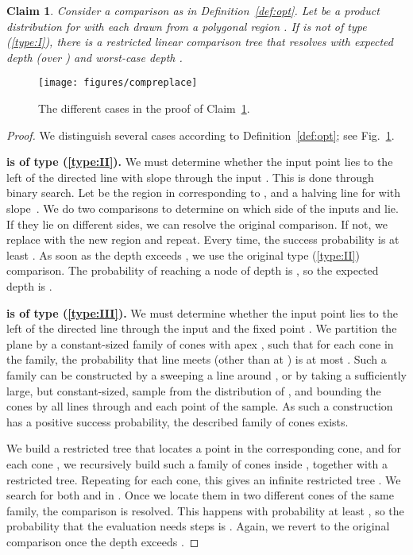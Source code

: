 \documentclass[letterpaper,11pt]{article}
\newtheorem{claim}[theorem]{Claim}
\begin{document}
\begin{claim} \label{clm:node} 
  Consider a comparison  as 
  in Definition~\ref{def:opt}. 
  Let  be a product distribution 
  for  with each  drawn 
  from a polygonal region . If  is not of
  type \textup(\ref{type:I}\textup), there is
  a restricted linear comparison tree  
  that resolves  with expected depth 
   (over ) and worst-case
  depth .
\end{claim}
\begin{figure}
  \centering
  \texttt{[image: figures/compreplace]}
  \caption{The different cases in the proof of Claim~\ref{clm:node}.}
  \label{fig:compreplace}
\end{figure}
\begin{proof}
We distinguish several cases 
according to Definition~\ref{def:opt}; 
see Fig.~\ref{fig:compreplace}.

\noindent\textbf{ is of type (\ref{type:II}).} 
We must determine 
whether the input point  lies 
to the left of the directed line 
with slope  
through the input .
This is done through binary search. 
Let  be the region in 
 corresponding to ,  
and  a halving line for 
 with slope~. We do 
two comparisons to determine 
on which side of  the inputs 
 and  lie. If they
lie on different sides, 
we can resolve the original comparison.
If not, we replace 
 with the new 
region and repeat. 
Every time, the success 
probability is at least .
As soon as the depth exceeds
, we use the original
type (\ref{type:II}) comparison.
The probability of reaching
a node of depth  is 
, so the expected 
depth is . 
   
\noindent\textbf{ is of type (\ref{type:III}).} 
We must determine whether 
the input point  lies 
to the left of the directed line 
through the input  
and the fixed point .
We partition the plane by a 
constant-sized family of cones
with apex , such that 
for each cone  in the family,
the probability that line 
 meets  
(other than at )
is at most . Such 
a family can be 
constructed by a sweeping a 
line around , or by
taking a sufficiently large, but 
constant-sized, sample from the 
distribution of , and 
bounding the cones by all lines 
through  and each point of 
the sample. As such a construction 
has a positive success probability,
the described family
of cones exists.
  
We build a restricted tree 
that locates a point in the 
corresponding cone, and
for each cone , we recursively 
build such a family of cones 
inside , together with a restricted
tree. Repeating for 
each cone, this gives an infinite 
restricted tree . We search 
for both  and  in . 
Once we locate them in 
two different cones of the same 
family, the comparison is resolved.
This happens with probability at least
, so 
the probability that the evaluation 
needs  steps is 
. Again, we revert
to the original comparison once the
depth exceeds .


\end{proof}
\end{document}
